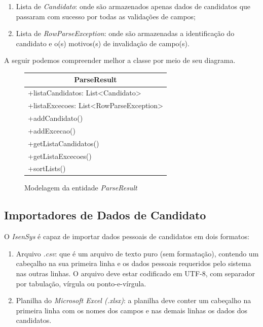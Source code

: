 \documentclass[
	12pt,			%
	openright,		%
	oneside,	
	a4paper,		%
	english,		%
	brazil			%
]{abntex2/abntex2}  %
\begin{document}
	\begin{enumerate}
			
		\item Lista de \textit{Candidato}: onde são armazenados apenas dados de candidatos que passaram com sucesso por todas as validações de campos;
		\item Lista de \textit{RowParseException}: onde são armazenadas a identificação do candidato e o(s) motivos(s) de invalidação de campo(s).
			
	\end{enumerate}
	
	A seguir podemos compreender melhor a classe por meio de seu diagrama.
	
	\begin{figure}[H]
		\begin{center}
			
			\caption{Modelagem da entidade \textit{ParseResult}}
			\label{parseresult-uml}
			
			\begin{tabular}{|l|}
				\hline
				\multicolumn{1}{|c|}{\textbf{ParseResult}} \\ \hline
				+listaCandidatos: List\textless{}Candidato\textgreater{} \\
				+listaExcecoes: List\textless{}RowParseException\textgreater{} \\ \hline
				+addCandidato() \\
				+addExcecao() \\
				+getListaCandidatos() \\
				+getListaExcecoes() \\
				+sortLists() \\ \hline
			\end{tabular}
			
		\end{center}
	\end{figure}
	
	\subsection{Importadores de Dados de Candidato}
	
	O \textit{IsenSys} é capaz de importar dados pessoais de candidatos em dois formatos:
	
	\begin{enumerate}
		
		\item Arquivo \textit{.csv}: que é um arquivo de texto puro (sem formatação), contendo um cabeçalho na sua primeira linha e os dados pessoais requeridos pelo sistema nas outras linhas. O arquivo deve estar codificado em UTF-8, com separador por tabulação, vírgula ou ponto-e-vírgula.
		
		\item Planilha do \textit{Microsoft Excel (.xlsx)}: a planilha deve conter um cabeçalho na primeira linha com os nomes dos campos e nas demais linhas os dados dos candidatos.
		
	\end{enumerate}
\end{document}
